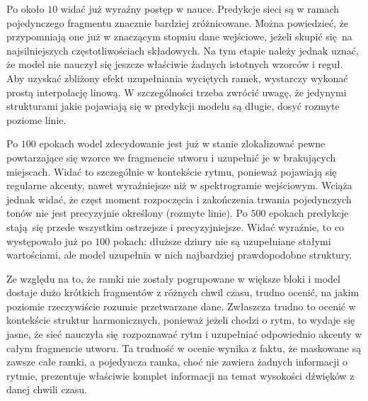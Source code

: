 Po około $10$ widać już wyraźny postęp w nauce. Predykcje sieci są w ramach pojedynczego fragmentu znacznie bardziej zróżnicowane. Można powiedzieć, że przypomniają one już w znaczącym stopniu dane wejściowe, jeżeli skupić się na najsilniejszych częstotliwościach składowych. Na tym etapie należy jednak uznać, że model nie nauczył się jeszcze właściwie żadnych istotnych wzorców i reguł. Aby uzyskać zbliżony efekt uzupełniania wyciętych ramek, wystarczy wykonać prostą interpolację linową. W szczególności trzeba zwrócić uwagę, że jedynymi strukturami jakie pojawiają się w predykcji modelu są długie, dosyć rozmyte poziome linie.

Po $100$ epokach wodel zdecydowanie jest już w stanie zlokalizować pewne powtarzające się wzorce we fragmencie utworu i uzupełnić je w brakujących miejscach. Widać to szczególnie w kontekście rytmu, ponieważ pojawiają się regularne akcenty, nawet wyraźniejsze niż w spektrogramie wejściowym. Wciąża jednak widać, że częst moment rozpoczęcia i zakończenia trwania pojedynczych tonów nie jest precyzyjnie określony (rozmyte linie). Po $500$ epokach predykcje stają się przede wszystkim ostrzejsze i precyzyjniejsze. Widać wyraźnie, to co występowało już po $100$ pokach: dłuższe dziury nie są uzupełniane stałymi wartościami, ale model uzupełnia w nich najbardziej prawdopodobne struktury.

Ze względu na to, że ramki nie zostały pogrupowane w większe bloki i model dostaje dużo krótkich fragmentów z różnych chwil czasu, trudno ocenić, na jakim poziomie rzeczywiście rozumie przetwarzane dane. Zwłaszcza trudno to ocenić w kontekście struktur harmonicznych, ponieważ jeżeli chodzi o rytm, to wydaje się jasne, że sieć nauczyła się rozpoznawać rytm i uzupełniać odpowiednio akcenty w całym fragmencie utworu. Ta trudność w ocenie wynika z faktu, że maskowane są zawsze całe ramki, a pojedyncza ramka, choć nie zawiera żadnych informacji o rytmie, prezentuje właściwie komplet informacji na temat wysokości dźwięków z danej chwili czasu.

